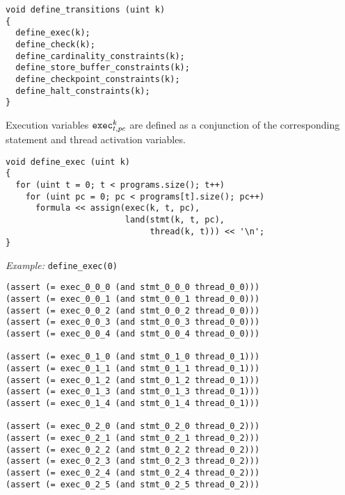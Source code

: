 \begin{lstlisting}[style=c++]
void define_transitions (uint k)
{
  define_exec(k);
  define_check(k);
  define_cardinality_constraints(k);
  define_store_buffer_constraints(k);
  define_checkpoint_constraints(k);
  define_halt_constraints(k);
}
\end{lstlisting}


\noindent
Execution variables $\texttt{exec}^k_{t, pc}$ are defined as a conjunction of the corresponding statement and thread activation variables.

\begin{lstlisting}[style=c++]
void define_exec (uint k)
{
  for (uint t = 0; t < programs.size(); t++)
    for (uint pc = 0; pc < programs[t].size(); pc++)
      formula << assign(exec(k, t, pc),
                        land(stmt(k, t, pc),
                             thread(k, t))) << '\n';
}
\end{lstlisting}

\noindent
\emph{Example:} \lstinline[style=c++]{define_exec(0)}

\begin{lstlisting}[language=smtlib]
(assert (= exec_0_0_0 (and stmt_0_0_0 thread_0_0)))
(assert (= exec_0_0_1 (and stmt_0_0_1 thread_0_0)))
(assert (= exec_0_0_2 (and stmt_0_0_2 thread_0_0)))
(assert (= exec_0_0_3 (and stmt_0_0_3 thread_0_0)))
(assert (= exec_0_0_4 (and stmt_0_0_4 thread_0_0)))

(assert (= exec_0_1_0 (and stmt_0_1_0 thread_0_1)))
(assert (= exec_0_1_1 (and stmt_0_1_1 thread_0_1)))
(assert (= exec_0_1_2 (and stmt_0_1_2 thread_0_1)))
(assert (= exec_0_1_3 (and stmt_0_1_3 thread_0_1)))
(assert (= exec_0_1_4 (and stmt_0_1_4 thread_0_1)))

(assert (= exec_0_2_0 (and stmt_0_2_0 thread_0_2)))
(assert (= exec_0_2_1 (and stmt_0_2_1 thread_0_2)))
(assert (= exec_0_2_2 (and stmt_0_2_2 thread_0_2)))
(assert (= exec_0_2_3 (and stmt_0_2_3 thread_0_2)))
(assert (= exec_0_2_4 (and stmt_0_2_4 thread_0_2)))
(assert (= exec_0_2_5 (and stmt_0_2_5 thread_0_2)))
\end{lstlisting}



